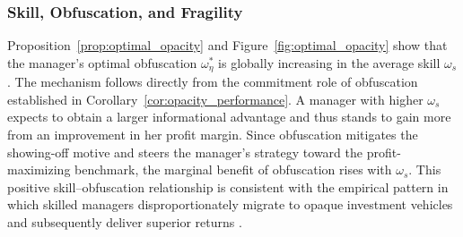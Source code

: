 
\subsubsection{Skill, Obfuscation, and Fragility}
Proposition~\ref{prop:optimal_opacity} and Figure~\ref{fig:optimal_opacity} show that the manager's optimal obfuscation $\omega_{\eta}^{*}$ is globally increasing in the average skill $\omega_{s}$.
The mechanism follows
directly from the commitment role of obfuscation established in
Corollary~\ref{cor:opacity_performance}.  A manager with higher $\omega_{s}$ expects to obtain a larger
informational advantage and thus stands to gain more from an improvement in
her profit margin. Since obfuscation mitigates the showing-off motive and steers
the manager's strategy toward the profit-maximizing benchmark, the marginal
benefit of obfuscation rises with $\omega_{s}$. This positive skill--obfuscation
relationship is consistent with the empirical pattern in which skilled
managers disproportionately migrate to opaque investment vehicles and
subsequently deliver superior returns \citep{kostovetsky2017brain}.

